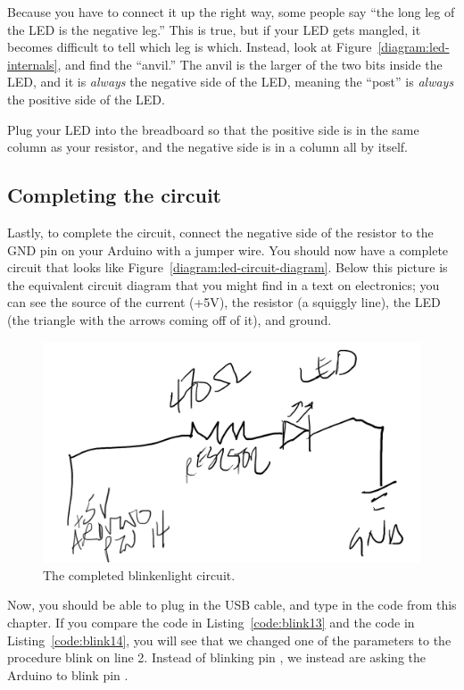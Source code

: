 Because you have to connect it up the right way, some people say ``the long leg of the LED is the negative leg.'' This is true, but if your LED gets mangled, it becomes difficult to tell which leg is which. Instead, look at Figure~\vref{diagram:led-internals}, and find the ``anvil.'' The anvil is the larger of the two bits inside the LED, and it is {\em always} the negative side of the LED, meaning the ``post'' is {\em always} the positive side of the LED.

Plug your LED into the breadboard so that the positive side is in the same column as your resistor, and the negative side is in a column all by itself.

\subsection{Completing the circuit}
Lastly, to complete the circuit, connect the negative side of the resistor to the {\code GND} pin on your Arduino with a jumper wire. You should now have a complete circuit that looks like Figure~\vref{diagram:led-circuit-diagram}. Below this picture is the equivalent circuit diagram that you might find in a text on electronics; you can see the source of the current ({\code +5V}), the resistor (a squiggly line), the LED (the triangle with the arrows coming off of it), and ground. 

\begin{figure}[ht]
  \begin{center}
    \includegraphics[width=0.8\linewidth]{images/ch2-led-circuit-diagram}
    \caption{The completed blinkenlight circuit.}
    \label{diagram:ch2-led-circuit-diagram}
  \end{center}
\end{figure}

Now, you should be able to plug in the USB cable, and type in the code from this chapter. If you compare the code in Listing~\vref{code:blink13} and the code in Listing~\vref{code:blink14}, you will see that we changed  one of the parameters to the procedure {\procname blink} on line 2. Instead of blinking pin {}, we instead are asking the Arduino to blink pin {}.

